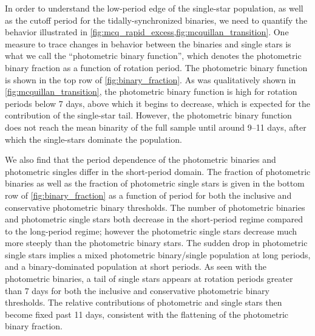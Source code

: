 \documentclass[manuscript]{aastex6}
\begin{document}
In order to understand the low-period edge of the single-star population, as
well as the cutoff period for the tidally-synchronized binaries, we need to
quantify the behavior illustrated in
\cref{fig:mcq_rapid_excess,fig:mcquillan_transition}. One measure to trace
changes in behavior between the binaries and single stars is what we call the 
``photometric binary function'', which denotes the photometric binary
fraction as a function of rotation period. The photometric binary function is 
shown in the top row of \cref{fig:binary_fraction}. As was 
qualitatively shown in \cref{fig:mcquillan_transition}, the photometric binary
function is high for rotation periods below 7 days, above which it begins to
decrease, which is expected for the contribution of the
single-star tail. However, the photometric binary function does not reach the 
mean binarity of the full sample until around 9--11 days, after which the 
single-stars dominate the population.

We also find that the period dependence of the photometric binaries and
photometric singles differ in the short-period domain. The fraction of
photometric binaries as well as the fraction of photometric single stars is 
given in the bottom row of \cref{fig:binary_fraction} as a function of period 
for both the inclusive and 
conservative photometric binary thresholds. The number of photometric binaries 
and photometric single stars both decrease in the short-period regime compared to the 
long-period regime; however the photometric single stars decrease much more 
steeply than the photometric binary stars. The sudden drop in photometric 
single stars implies a mixed photometric binary/single population at long 
periods, and a binary-dominated population at short periods. As seen with the
photometric binaries, a tail of single stars appears at rotation periods 
greater than 7 days for both the inclusive and conservative photometric binary 
thresholds. The relative contributions of photometric and single stars then 
become fixed past 11 days, consistent with the flattening of the photometric 
binary fraction. 
\end{document}

